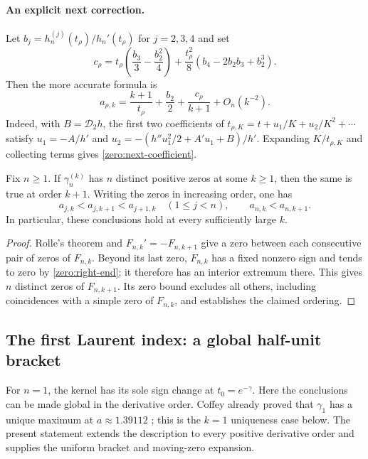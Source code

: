 \paragraph{An explicit next correction.}
Let $b_j=h_n^{(j)}(t_\rho)/h_n'(t_\rho)$ for $j=2,3,4$ and set
\begin{equation}\label{zero:next-coefficient}
 c_\rho=t_\rho\left(\frac{b_3}{3}-\frac{b_2^2}{4}\right)
      +\frac{t_\rho^2}{8}
                    \left(b_4-2b_2b_3+b_2^3\right).
\end{equation}
Then the more accurate formula is
\begin{equation}\label{zero:location-second}
 a_{\rho,k}=\frac{k+1}{t_\rho}+\frac{b_2}{2}
                         +\frac{c_\rho}{k+1}+O_n(k^{-2}).
\end{equation}
Indeed, with $B=\mathcal D_2h$, the first two coefficients of
$t_{\rho,K}=t+u_1/K+u_2/K^2+\cdots$ satisfy
$u_1=-A/h'$ and
$u_2=-(h''u_1^2/2+A'u_1+B)/h'$.  Expanding $K/t_{\rho,K}$
and collecting terms gives \eqref{zero:next-coefficient}.

\begin{corollary}
\label{zero:k-interlace}
Fix $n\geq1$. If $\gamma_n^{(k)}$ has $n$ distinct positive
zeros at some $k\geq1$, then the same is true at order $k+1$.
Writing the zeros in increasing order, one has
\[
 a_{j,k}<a_{j,k+1}<a_{j+1,k}\quad(1\leq j<n),
 \qquad a_{n,k}<a_{n,k+1}.
\]
In particular, these conclusions hold at every sufficiently large $k$.
\end{corollary}
\begin{proof}
Rolle's theorem and $F_{n,k}'=-F_{n,k+1}$ give a zero between each
consecutive pair of zeros of $F_{n,k}$.  Beyond its last zero,
$F_{n,k}$ has a fixed nonzero sign and tends to zero by
\eqref{zero:right-end}; it therefore has an interior extremum there.
This gives $n$ distinct zeros of $F_{n,k+1}$.  Its zero bound
excludes all others, including coincidences with a simple zero of
$F_{n,k}$, and establishes the claimed ordering.
\end{proof}

\subsection{The first Laurent index: a global half-unit bracket}

For $n=1$, the kernel has its sole sign change at $t_0=e^{-\gamma}$.
Here the conclusions can be made global in the derivative order.
Coffey already proved that $\gamma_1$ has a unique maximum at
$a\approx1.39112$ \cite[Proposition 5]{Coffey2009}; this is the
$k=1$ uniqueness case below.  The present statement extends the
description to every positive derivative order and supplies the
uniform bracket and moving-zero expansion.

